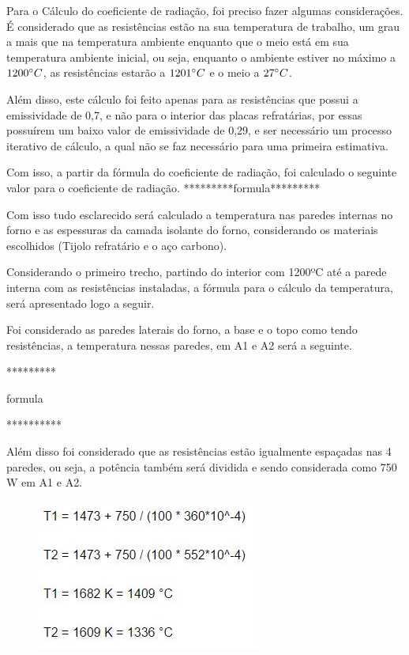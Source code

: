 Para o Cálculo do coeficiente de radiação, foi preciso fazer algumas considerações. É considerado que as resistências estão na sua temperatura de trabalho, um grau a mais que na temperatura ambiente enquanto que o meio está em sua temperatura ambiente inicial, ou seja, enquanto o ambiente estiver no máximo a $1200\degree C$, as resistências estarão a $1201\degree C$ e o meio a $27\degree C$. 

Além disso, este cálculo foi feito apenas para as resistências que possui a emissividade de 0,7, e não para o interior das placas refratárias, por essas possuírem um baixo valor de emissividade de 0,29, e ser necessário um processo iterativo de cálculo, a qual não se faz necessário para uma primeira estimativa.

Com isso, a partir da fórmula do coeficiente de radiação, foi calculado o seguinte valor para o coeficiente de radiação.
*********formula*********

Com isso tudo esclarecido será calculado a temperatura nas paredes internas no forno e as espessuras da camada isolante do forno, considerando os materiais escolhidos (Tijolo refratário e o aço carbono).

Considerando o primeiro trecho, partindo do interior com 1200ºC até a parede interna com as resistências instaladas, a fórmula para o cálculo da temperatura, será apresentado logo a seguir.

Foi considerado as paredes laterais do forno, a base e o topo como tendo resistências, a temperatura nessas paredes, em A1 e A2 será a seguinte.

*********

formula

**********

Além disso foi considerado que as resistências estão igualmente espaçadas nas 4 paredes, ou seja, a potência também será dividida e sendo considerada como 750 W em A1 e A2.

\begin{figure}[H]
	\centering
	\label{form3}
	\includegraphics[keepaspectratio=true,scale=1.0]{figuras/form3.JPG}
\end{figure}


